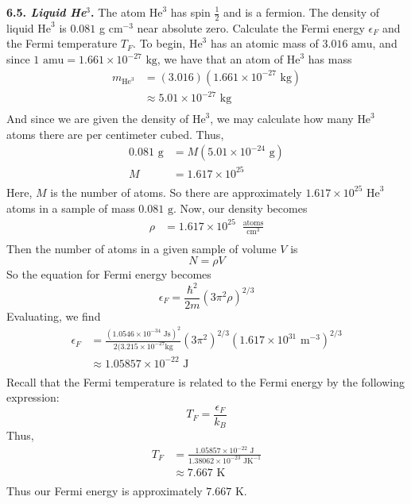 \documentclass{article}
\begin{document}
\textbf{6.5. \textit{Liquid He}}$^3$\textbf{.} The atom $\text{He}^3$ has spin $\frac{1}{2}$ and is a fermion. The density of liquid $\text{He}^3$ is $0.081$ g $\text{cm}^{-3}$ near absolute zero. Calculate the Fermi energy $\epsilon_F$ and the Fermi temperature $T_F$.
\newline\newline
To begin, $\text{He}^3$ has an atomic mass of $3.016 \text{ amu}$, and since $1 \text{ amu} = 1.661\times 10^{-27} \text{ kg}$, we have that an atom of $\text{He}^3$ has mass
\begin{align*}
    m_{\text{He}^3} &= (3.016)(1.661\times 10^{-27} \text{ kg}) \\
    &\approx 5.01 \times 10^{-27} \text{ kg} \\
\end{align*}
And since we are given the density of $\text{He}^3$, we may calculate how many $\text{He}^3$ atoms there are per centimeter cubed. Thus,
\begin{align*}
    0.081 \text{ g} &= M(5.01\times 10^{-24} \text{ g}) \\
    M &= 1.617 \times 10^{25}\\
\end{align*}
Here, $M$ is the number of atoms.
\newline
So there are approximately $1.617 \times 10^{25}$ $\text{He}^3$ atoms in a sample of mass $0.081 \text{ g}$. Now, our density becomes
\begin{align*}
    \rho &= 1.617 \times 10^{25} \;\;\frac{\text{atoms}}{\text{cm}^3} \\
\end{align*}
Then the number of atoms in a given sample of volume $V$ is 
\[N = \rho V\]
So the equation for Fermi energy becomes
\[\epsilon_F = \frac{\hbar^2}{2m}(3\pi^2\rho)^{2/3}\]
Evaluating, we find
\begin{align*}
        \epsilon_F &= \frac{(1.0546\times 10^{-34} \text{ Js})^2}{2(3.215\times 10^{-27} \text {kg}}(3\pi^2)^{2/3}(1.617 \times 10^{31} \text{ m}^{-3})^{2/3} \\
        &\approx 1.05857 \times 10^{-22} \text{ J} \\
\end{align*}
Recall that the Fermi temperature is related to the Fermi energy by the following expression:
\[T_F = \frac{\epsilon_F}{k_B}\]
Thus,
\begin{align*}
    T_F &= \frac{1.05857\times 10^{-22} \text{ J}}{1.38062\times 10^{-23} \text{ JK}^{-1}} \\
    &\approx 7.667 \text{ K} \\
\end{align*}
Thus our Fermi energy is approximately $7.667$ K.
\end{document}
